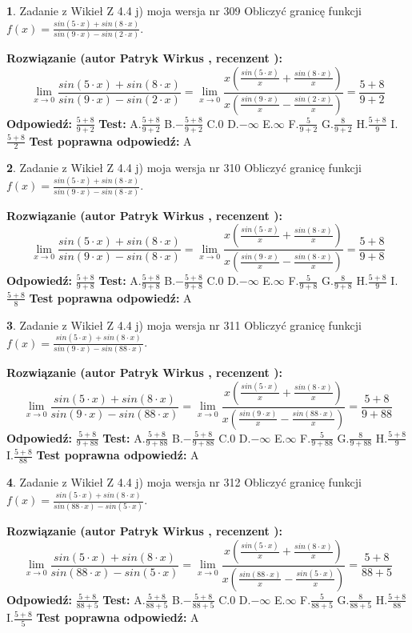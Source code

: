 \documentclass[12pt, a4paper]{article}
\theoremstyle{definition} %
\newtheorem{zad}{}
\newcommand{\zadStart}[1]{\begin{zad}#1\newline}
\newcommand{\zadStop}{\end{zad}}
\newcommand{\rozwStart}[2]{\noindent \textbf{Rozwiązanie (autor #1 , recenzent #2): }\newline}
\newcommand{\rozwStop}{\newline}
\newcommand{\odpStart}{\noindent \textbf{Odpowiedź:}\newline}
\newcommand{\odpStop}{\newline}
\newcommand{\testStart}{\noindent \textbf{Test:}\newline}
\newcommand{\testStop}{\newline}
\newcommand{\kluczStart}{\noindent \textbf{Test poprawna odpowiedź:}\newline}
\newcommand{\kluczStop}{\newline}
\begin{document}
\zadStart{Zadanie z Wikieł Z 4.4 j) moja wersja nr 309}
Obliczyć granicę funkcji $f(x)=\frac{sin(5\cdot x) +sin(8\cdot x)}{sin(9\cdot x) -sin(2\cdot x)}$.
\zadStop
\rozwStart{Patryk Wirkus}{}
$$\lim\limits_{x\to 0}\frac{sin(5\cdot x) +sin(8\cdot x)}{sin(9\cdot x) -sin(2\cdot x)}=\lim\limits_{x\to 0}\frac{x(\frac{sin(5\cdot x)}{x}+\frac{sin(8\cdot x)}{x})}{x(\frac{sin(9\cdot x)}{x}-\frac{sin(2\cdot x)}{x})}=\frac{5+8}{9+2}$$
\rozwStop
\odpStart
$\frac{5+8}{9+2}$
\odpStop
\testStart
A.$\frac{5+8}{9+2}$
B.$-\frac{5+8}{9+2}$
C.$0$
D.$-\infty$
E.$\infty$
F.$\frac{5}{9+2}$
G.$\frac{8}{9+2}$
H.$\frac{5+8}{9}$
I.$\frac{5+8}{2}$
\testStop
\kluczStart
A
\kluczStop



\zadStart{Zadanie z Wikieł Z 4.4 j) moja wersja nr 310}
Obliczyć granicę funkcji $f(x)=\frac{sin(5\cdot x) +sin(8\cdot x)}{sin(9\cdot x) -sin(8\cdot x)}$.
\zadStop
\rozwStart{Patryk Wirkus}{}
$$\lim\limits_{x\to 0}\frac{sin(5\cdot x) +sin(8\cdot x)}{sin(9\cdot x) -sin(8\cdot x)}=\lim\limits_{x\to 0}\frac{x(\frac{sin(5\cdot x)}{x}+\frac{sin(8\cdot x)}{x})}{x(\frac{sin(9\cdot x)}{x}-\frac{sin(8\cdot x)}{x})}=\frac{5+8}{9+8}$$
\rozwStop
\odpStart
$\frac{5+8}{9+8}$
\odpStop
\testStart
A.$\frac{5+8}{9+8}$
B.$-\frac{5+8}{9+8}$
C.$0$
D.$-\infty$
E.$\infty$
F.$\frac{5}{9+8}$
G.$\frac{8}{9+8}$
H.$\frac{5+8}{9}$
I.$\frac{5+8}{8}$
\testStop
\kluczStart
A
\kluczStop



\zadStart{Zadanie z Wikieł Z 4.4 j) moja wersja nr 311}
Obliczyć granicę funkcji $f(x)=\frac{sin(5\cdot x) +sin(8\cdot x)}{sin(9\cdot x) -sin(88\cdot x)}$.
\zadStop
\rozwStart{Patryk Wirkus}{}
$$\lim\limits_{x\to 0}\frac{sin(5\cdot x) +sin(8\cdot x)}{sin(9\cdot x) -sin(88\cdot x)}=\lim\limits_{x\to 0}\frac{x(\frac{sin(5\cdot x)}{x}+\frac{sin(8\cdot x)}{x})}{x(\frac{sin(9\cdot x)}{x}-\frac{sin(88\cdot x)}{x})}=\frac{5+8}{9+88}$$
\rozwStop
\odpStart
$\frac{5+8}{9+88}$
\odpStop
\testStart
A.$\frac{5+8}{9+88}$
B.$-\frac{5+8}{9+88}$
C.$0$
D.$-\infty$
E.$\infty$
F.$\frac{5}{9+88}$
G.$\frac{8}{9+88}$
H.$\frac{5+8}{9}$
I.$\frac{5+8}{88}$
\testStop
\kluczStart
A
\kluczStop



\zadStart{Zadanie z Wikieł Z 4.4 j) moja wersja nr 312}
Obliczyć granicę funkcji $f(x)=\frac{sin(5\cdot x) +sin(8\cdot x)}{sin(88\cdot x) -sin(5\cdot x)}$.
\zadStop
\rozwStart{Patryk Wirkus}{}
$$\lim\limits_{x\to 0}\frac{sin(5\cdot x) +sin(8\cdot x)}{sin(88\cdot x) -sin(5\cdot x)}=\lim\limits_{x\to 0}\frac{x(\frac{sin(5\cdot x)}{x}+\frac{sin(8\cdot x)}{x})}{x(\frac{sin(88\cdot x)}{x}-\frac{sin(5\cdot x)}{x})}=\frac{5+8}{88+5}$$
\rozwStop
\odpStart
$\frac{5+8}{88+5}$
\odpStop
\testStart
A.$\frac{5+8}{88+5}$
B.$-\frac{5+8}{88+5}$
C.$0$
D.$-\infty$
E.$\infty$
F.$\frac{5}{88+5}$
G.$\frac{8}{88+5}$
H.$\frac{5+8}{88}$
I.$\frac{5+8}{5}$
\testStop
\kluczStart
A
\kluczStop
\end{document}
